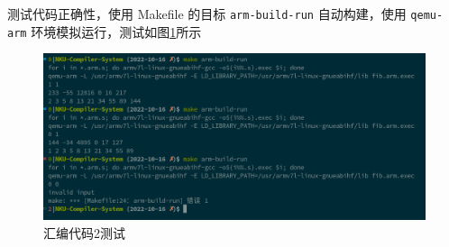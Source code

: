 \documentclass[UTF8,a4paper,10pt]{ctexart}
\begin{document}
测试代码正确性，使用 Makefile 的目标 \verb|arm-build-run| 自动构建，使用 \verb|qemu-arm| 环境模拟运行，测试如图\ref{fig:2}所示

\begin{figure}[H]
  \centering
  \includegraphics[width=1\textwidth]{figure/2.png}
  \caption{汇编代码2测试}
  \label{fig:2}
\end{figure}
\end{document}
